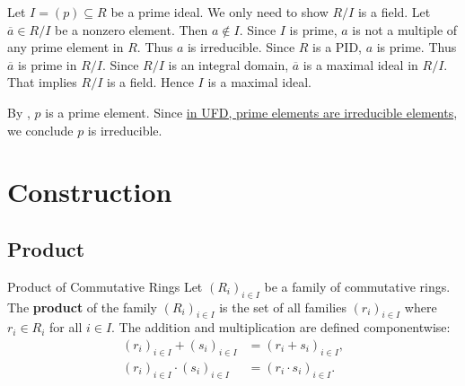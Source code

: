 \begin{prf}
    Let $I=(p)\subseteq R$ be a prime ideal. We only need to show $R/I$ is a field. Let $\overline{a}\in R/I$ be a nonzero element. Then $a\notin I$. Since $I$ is prime, $a$ is not a multiple of any prime element in $R$. Thus $a$ is irreducible. Since $R$ is a PID, $a$ is prime. Thus $\overline{a}$ is prime in $R/I$. Since $R/I$ is an integral domain, $\overline{a}$ is a maximal ideal in $R/I$. That implies $R/I$ is a field. Hence $I$ is a maximal ideal.

    By , $p$ is a prime element. Since \hyperref[th:irreducible_element_iff_prime_element_in_UFD]{ in UFD, prime elements are irreducible elements}, we conclude $p$ is irreducible.
\end{prf}




\section{Construction}

\subsection{Product}
\begin{definition}{Product of Commutative Rings}{}
    Let $(R_i)_{i\in I}$ be a family of commutative rings. The \textbf{product} of the family $(R_i)_{i\in I}$ is the set of all families $(r_i)_{i\in I}$ where $r_i\in R_i$ for all $i\in I$. The addition and multiplication are defined componentwise:
    \begin{align*}
        (r_i)_{i\in I}+(s_i)_{i\in I}&=(r_i+s_i)_{i\in I},\\
        (r_i)_{i\in I}\cdot(s_i)_{i\in I}&=(r_i\cdot s_i)_{i\in I}.
    \end{align*}
\end{definition}



